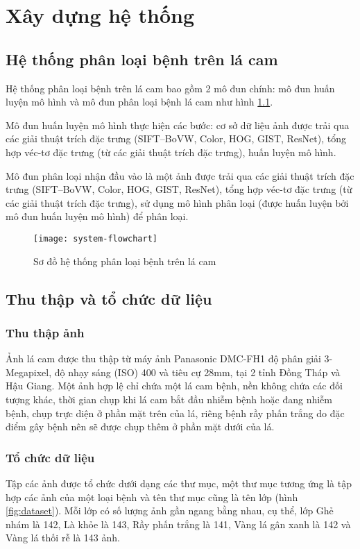 \chapter{Xây dựng hệ thống} \label{chapter03}

\section{Hệ thống phân loại bệnh trên lá cam}

Hệ thống phân loại bệnh trên lá cam bao gồm 2 mô đun chính: mô đun huấn luyện mô hình và mô đun phân loại bệnh lá cam như hình \ref{fig:system-flowchart}.\par

Mô đun huấn luyện mô hình thực hiện các bước: cơ sở dữ liệu ảnh được trải qua các giải thuật trích đặc trưng (SIFT--BoVW, Color, HOG, GIST, ResNet), tổng hợp véc-tơ đặc trưng (từ các giải thuật trích đặc trưng), huấn luyện mô hình. 

Mô đun phân loại nhận đầu vào là một ảnh được trải qua các giải thuật trích đặc trưng (SIFT--BoVW, Color, HOG, GIST, ResNet), tổng hợp véc-tơ đặc trưng (từ các giải thuật trích đặc trưng), sử dụng mô hình phân loại (được huấn luyện bởi mô đun huấn luyện mô hình) để phân loại. 
 
\begin{figure}[h]
	\centering
	\texttt{[image: system-flowchart]}
	\caption{Sơ đồ hệ thống phân loại bệnh trên lá cam}
	\label{fig:system-flowchart}
\end{figure}

\section{Thu thập và tổ chức dữ liệu}
\subsection{Thu thập ảnh}
Ảnh lá cam được thu thập từ máy ảnh Panasonic DMC-FH1 độ phân giải 3-Megapixel, độ nhạy sáng (ISO) 400 và tiêu cự 28mm, tại 2 tỉnh Đồng Tháp và Hậu Giang. Một ảnh hợp lệ chỉ chứa một lá cam bệnh, nền không chứa các đối tượng khác, thời gian chụp khi lá cam bắt đầu nhiễm bệnh hoặc đang nhiễm bệnh, chụp trực diện ở phần mặt trên của lá, riêng bệnh rầy phấn trắng do đặc điểm gây bệnh nên sẽ được chụp thêm ở phần mặt dưới của lá.

\subsection{Tổ chức dữ liệu}\label{sub:to-chuc-du-lieu}
Tập các ảnh được tổ chức dưới dạng các thư mục, một thư mục tương ứng là tập hợp các ảnh của một loại bệnh và tên thư mục cũng là tên lớp (hình \ref{fig:dataset}). Mỗi lớp có số lượng ảnh gần ngang bằng nhau, cụ thể, lớp Ghẻ nhám là 142, Là khỏe là 143, Rầy phấn trắng là 141, Vàng lá gân xanh là 142 và Vàng lá thối rễ là 143 ảnh.\par

